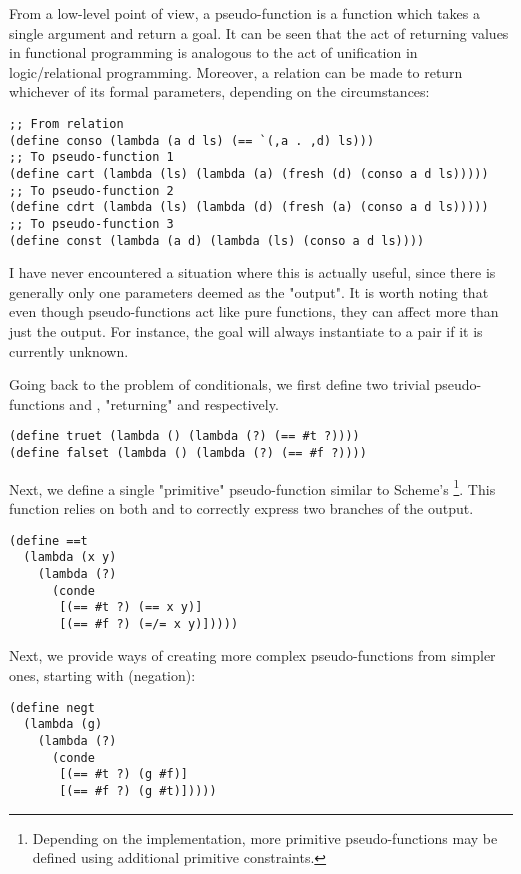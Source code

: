 From a low-level point of view, a pseudo-function is a function which takes a single argument and return a goal. It can be seen that the act of returning values in functional programming is analogous to the act of unification in logic/relational programming. Moreover, a relation can be made to return whichever of its formal parameters, depending on the circumstances:
\begin{lstlisting}
;; From relation
(define conso (lambda (a d ls) (== `(,a . ,d) ls)))
;; To pseudo-function 1
(define cart (lambda (ls) (lambda (a) (fresh (d) (conso a d ls)))))
;; To pseudo-function 2
(define cdrt (lambda (ls) (lambda (d) (fresh (a) (conso a d ls)))))
;; To pseudo-function 3
(define const (lambda (a d) (lambda (ls) (conso a d ls))))
\end{lstlisting}
I have never encountered a situation where this is actually useful, since there is generally only one parameters deemed as the "output". It is worth noting that even though pseudo-functions act like pure functions, they can affect more than just the output. For instance, the goal  will always instantiate  to a pair if it is currently unknown.

Going back to the problem of conditionals, we first define two trivial pseudo-functions  and , "returning"  and  respectively.

\begin{lstlisting}
(define truet (lambda () (lambda (?) (== #t ?))))
(define falset (lambda () (lambda (?) (== #f ?))))
\end{lstlisting}

Next, we define a single "primitive" pseudo-function similar to Scheme's \footnote{Depending on the implementation, more primitive pseudo-functions may be defined using additional primitive constraints.}. This function relies on both \code{==} and \code{=/=} to correctly express two branches of the output.
\begin{lstlisting}
(define ==t
  (lambda (x y)
    (lambda (?)
      (conde
       [(== #t ?) (== x y)]
       [(== #f ?) (=/= x y)]))))
\end{lstlisting}

Next, we provide ways of creating more complex pseudo-functions from simpler ones, starting with  (negation):
\begin{lstlisting}
(define negt
  (lambda (g)
    (lambda (?)
      (conde
       [(== #t ?) (g #f)]
       [(== #f ?) (g #t)]))))
\end{lstlisting}

